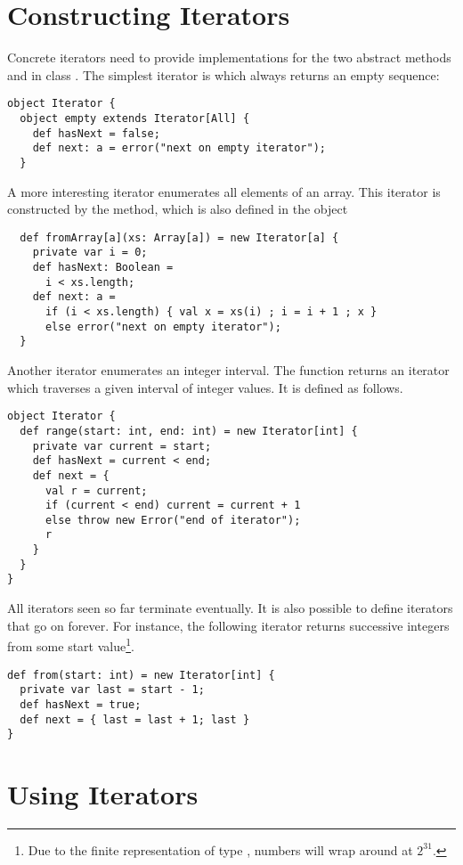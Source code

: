 {\section{Constructing Iterators}

Concrete iterators need to provide implementations for the two
abstract methods  and  in class
. The simplest iterator is  which
always returns an empty sequence:
\begin{lstlisting}
object Iterator {
  object empty extends Iterator[All] {
    def hasNext = false;
    def next: a = error("next on empty iterator");
  }
\end{lstlisting}
A more interesting iterator enumerates all elements of an array. This
iterator is constructed by the  method, which is also defined in the object 
\begin{lstlisting}
  def fromArray[a](xs: Array[a]) = new Iterator[a] {
    private var i = 0;
    def hasNext: Boolean = 
      i < xs.length;
    def next: a = 
      if (i < xs.length) { val x = xs(i) ; i = i + 1 ; x }
      else error("next on empty iterator");
  }
\end{lstlisting}
Another iterator enumerates an integer interval.  The
 function returns an iterator which traverses a
given interval of integer values. It is defined as follows.
\begin{lstlisting}
object Iterator {
  def range(start: int, end: int) = new Iterator[int] {
    private var current = start;
    def hasNext = current < end;
    def next = {
      val r = current;
      if (current < end) current = current + 1
      else throw new Error("end of iterator");
      r
    }
  }
}
\end{lstlisting}
All iterators seen so far terminate eventually. It is also possible to
define iterators that go on forever. For instance, the following
iterator returns successive integers from some start
value\footnote{Due to the finite representation of type ,
numbers will wrap around at $2^31$.}.
\begin{lstlisting}
def from(start: int) = new Iterator[int] {
  private var last = start - 1;
  def hasNext = true;
  def next = { last = last + 1; last }
}
\end{lstlisting}

\section{Using Iterators}

}
